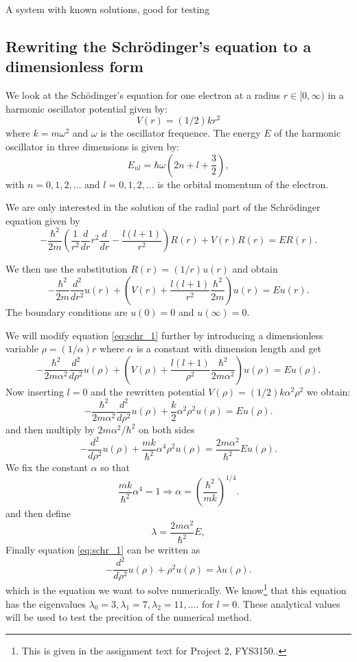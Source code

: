 \documentclass[11pt,a4wide]{article}
\begin{document}
A system with known solutions, good for testing
\subsection{Rewriting the Schr\"odinger's equation to a dimensionless form} \label{sec:rewrite_sch}
We look at the Sch\"odinger's equation for one electron at a radius $r\in [0,\infty)$ in a harmonic oscillator potential given by: 
\[
V(r)= (1/2)kr^2
\]
where $k=m\omega^2$ and $\omega$ is the oscillator frequence. The energy $E$ of the harmonic oscillator in three dimensions is given by:
\[
E_{nl}=  \hbar \omega \left(2n+l+\frac{3}{2}\right),
\]
with $n=0,1,2,\dots$ and $l=0,1,2,\dots$ is the orbital momentum of the electron. 

We are only interested in the solution of the radial part of the Schr\"odinger equation given by
\begin{equation}
  -\frac{\hbar^2}{2 m} \left ( \frac{1}{r^2} \frac{d}{dr} r^2
  \frac{d}{dr} - \frac{l (l + 1)}{r^2} \right )R(r) 
     + V(r) R(r) = E R(r).
     \label{eq:schr_1}
\end{equation}

We then use the substitution $R(r) = (1/r) u(r)$ and obtain
\[
  -\frac{\hbar^2}{2 m} \frac{d^2}{dr^2} u(r) 
       + \left ( V(r) + \frac{l (l + 1)}{r^2}\frac{\hbar^2}{2 m}
                                    \right ) u(r)  = E u(r) .
\]
The boundary conditions are $u(0)=0$ and $u(\infty)=0$.

We will modify equation \ref{eq:schr_1} further by introducing a dimensionless variable $\rho = (1/\alpha) r$ where $\alpha$ is a constant with dimension length and get
% 
\[
  -\frac{\hbar^2}{2 m \alpha^2} \frac{d^2}{d\rho^2} u(\rho) 
       + \left ( V(\rho) + \frac{l (l + 1)}{\rho^2}
         \frac{\hbar^2}{2 m\alpha^2} \right ) u(\rho)  = E u(\rho) .
\]
%
Now inserting $l=0$ and the rewritten potential $V(\rho) = (1/2) k \alpha^2\rho^2$ we obtain:
\[
  -\frac{\hbar^2}{2 m \alpha^2} \frac{d^2}{d\rho^2} u(\rho) 
       + \frac{k}{2} \alpha^2\rho^2u(\rho)  = E u(\rho) .
\]
and then multiply by $2m\alpha^2/\hbar^2$ on both sides
\[
  -\frac{d^2}{d\rho^2} u(\rho) 
       + \frac{mk}{\hbar^2} \alpha^4\rho^2u(\rho)  = \frac{2m\alpha^2}{\hbar^2}E u(\rho) .
\]
We fix the constant $\alpha$ so that
\[
\frac{mk}{\hbar^2} \alpha^4 = 1 \Rightarrow \alpha = \left(\frac{\hbar^2}{mk}\right)^{1/4}.
\]
and then define 
\[
\lambda = \frac{2m\alpha^2}{\hbar^2}E,
\]
Finally equation \ref{eq:schr_1} can be written as
\begin{equation}
  -\frac{d^2}{d\rho^2} u(\rho) + \rho^2u(\rho)  = \lambda u(\rho) .
  \label{eq: sch_1D_final}
\end{equation}
which is the equation we want to solve numerically. We know\footnote{This is given in the assignment text for Project 2, FYS3150..} that this equation has the eigenvalues $\lambda_0=3,\lambda_1=7,\lambda_2=11,\dots .$ for $l=0$. These analytical values will be used to test the precition of the numerical method.
\end{document}
